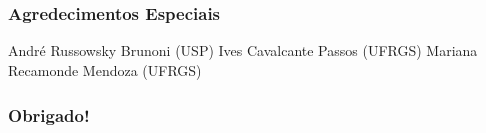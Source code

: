 \documentclass{beamer}
\begin{document}
    \section*{}

    \begin{frame}
        \frametitle{Agredecimentos Especiais}
        André Russowsky Brunoni (USP) \linebreak\linebreak
        Ives Cavalcante Passos (UFRGS) \linebreak\linebreak
        Mariana Recamonde Mendoza (UFRGS)
    \end{frame}

    \begin{frame}
        \frametitle{Obrigado!}
        \InfContacts
    \end{frame}
\end{document}

